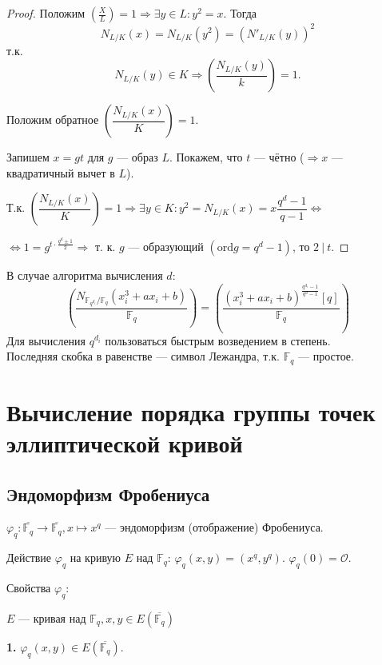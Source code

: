 \documentclass[12pt]{article}
\newcommand{\F}{{{\mathbb F}}}
\newcommand{\Fqd}{{{\F_{q^{d_i}}}}}
\newcommand{\bigO}{\mathcal{O}}
\theoremstyle{definition}
\theoremstyle{definition}
\theoremstyle{definition}
\begin{document}
\begin{proof}
    Положим $( {\frac{X}{L}} ) = 1 \Rightarrow \exists y \in L: y^2 = x.$ Тогда 
    $$
    {N_{L/K}}( x ) = {N_{L/K}}( {{y^2}} ) = {( {N'_{L/K}( y )} )^2}
    $$
    т.к. 
    $$
    N_{L/K}( y ) \in K \Rightarrow \left( {\frac{N_{L/K}( y )}{k}} \right) = 1.
    $$
    
    Положим обратное $\left( {\dfrac{{{N_{L/K}}( x )}}{K}} \right) = 1$.
    
    Запишем $x = gt$ для $g$ — образ $L$. Покажем, что $t$ — чётно ($ \Rightarrow x $ — квадратичный вычет в $L$).
    
    Т.к. $\left( {\dfrac{N_{L/K}( x )}{K}} \right) = 1 \Rightarrow \exists y \in K: {y^2} = {N_{L/K}}( x ) = x\dfrac{{{q^d} - 1}}{{q - 1}} \Leftrightarrow $
    
    $ \Leftrightarrow 1 = {g^{t \cdot \frac{{q^d} \pm 1}{2}}} \Rightarrow $ т. к. $g$ — образующий $( {{\text{ord}} g = {q^d} - 1} )$, то $2\ |\ t$.
\end{proof}

В случае алгоритма вычисления $d$:
$$
\left( \dfrac{N_{\Fqd/\F_q} (x_i^3 + ax_i + b)}{\F_q} \right) = \left( \dfrac{(x_i^3 + ax_i + b)^{\frac{q^{d_i} - 1}{q^d - 1}} [q]}{\F_q} \right)
$$
Для вычисления $q^{d_i}$ пользоваться быстрым возведением в степень. \\
Последняя скобка в равенстве — символ Лежандра, т.к. $\F_q$ — простое.

\section{Вычисление порядка группы точек эллиптической кривой}

\subsection{Эндоморфизм Фробениуса}

${\varphi_q}: \overline {{\F_q}}  \to \overline {\F_q}, x \mapsto x^q $ — эндоморфизм (отображение) Фробениуса.

Действие ${\varphi _q}$ на кривую $E$ над ${\F_q}$:\; ${\varphi _q}(x, y) = (x^q, y^q)$. ${\varphi _q}( 0 ) = \bigO$. 

Свойства ${\varphi _q}:$

$E$ — кривая над ${\F_q}, x, y \in E(\overline{\F_q})$

\textbf{1.} ${\varphi _q}( {x,y} ) \in E( \overline{\F_q} )$. 
\end{document}

